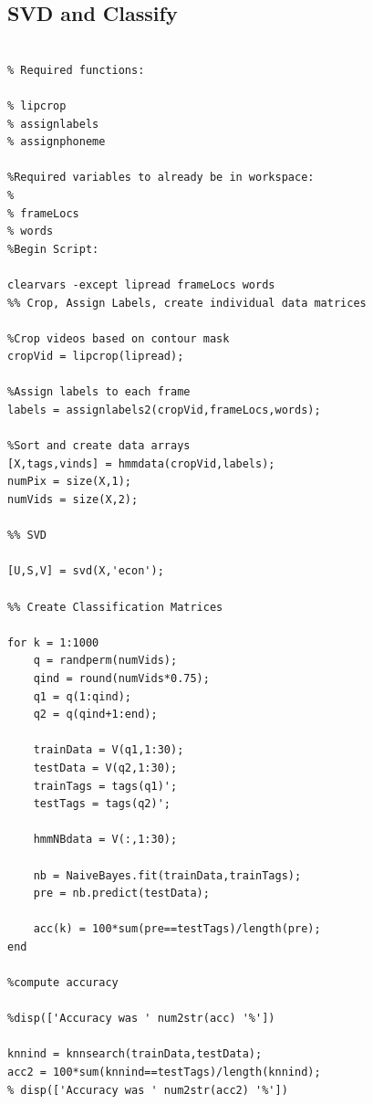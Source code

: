 \documentclass[a4paper]{article}
\begin{document}
\subsection{SVD and Classify}
\begin{lstlisting}[style=myMatlabstyle]

% Required functions:

% lipcrop
% assignlabels
% assignphoneme

%Required variables to already be in workspace:
% 
% frameLocs
% words
%Begin Script:

clearvars -except lipread frameLocs words
%% Crop, Assign Labels, create individual data matrices

%Crop videos based on contour mask
cropVid = lipcrop(lipread);

%Assign labels to each frame
labels = assignlabels2(cropVid,frameLocs,words);

%Sort and create data arrays
[X,tags,vinds] = hmmdata(cropVid,labels);
numPix = size(X,1);
numVids = size(X,2);

%% SVD

[U,S,V] = svd(X,'econ');

%% Create Classification Matrices

for k = 1:1000
    q = randperm(numVids);
    qind = round(numVids*0.75);
    q1 = q(1:qind);
    q2 = q(qind+1:end);
    
    trainData = V(q1,1:30);
    testData = V(q2,1:30);
    trainTags = tags(q1)';
    testTags = tags(q2)';
    
    hmmNBdata = V(:,1:30);
    
    nb = NaiveBayes.fit(trainData,trainTags);
    pre = nb.predict(testData);
    
    acc(k) = 100*sum(pre==testTags)/length(pre);
end

%compute accuracy

%disp(['Accuracy was ' num2str(acc) '%'])

knnind = knnsearch(trainData,testData);
acc2 = 100*sum(knnind==testTags)/length(knnind);
% disp(['Accuracy was ' num2str(acc2) '%'])

\end{lstlisting}
\end{document}
